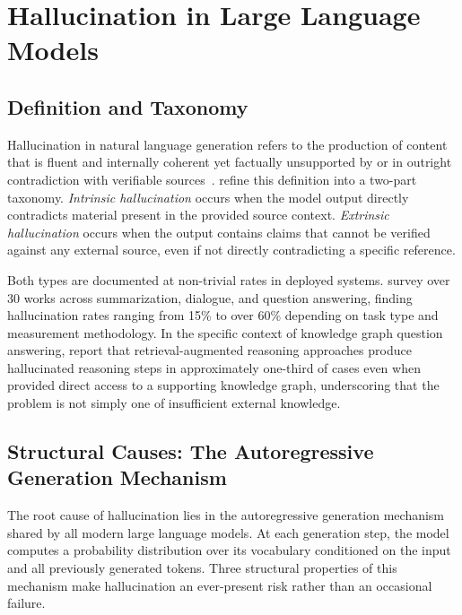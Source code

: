 \section{Hallucination in Large Language Models}
\label{sec:hallucination}

\subsection{Definition and Taxonomy}

Hallucination in natural language generation refers to the production of content that is fluent and internally coherent yet factually unsupported by or in outright contradiction with verifiable sources~\citep{ji2023survey}. \citet{huang2023hallucination} refine this definition into a two-part taxonomy. \textit{Intrinsic hallucination} occurs when the model output directly contradicts material present in the provided source context. \textit{Extrinsic hallucination} occurs when the output contains claims that cannot be verified against any external source, even if not directly contradicting a specific reference.

Both types are documented at non-trivial rates in deployed systems. \citet{ji2023survey} survey over 30 works across summarization, dialogue, and question answering, finding hallucination rates ranging from 15\% to over 60\% depending on task type and measurement methodology. In the specific context of knowledge graph question answering, \citet{luo2024gcr} report that retrieval-augmented reasoning approaches produce hallucinated reasoning steps in approximately one-third of cases even when provided direct access to a supporting knowledge graph, underscoring that the problem is not simply one of insufficient external knowledge.

\subsection{Structural Causes: The Autoregressive Generation Mechanism}

The root cause of hallucination lies in the autoregressive generation mechanism shared by all modern large language models. At each generation step, the model computes a probability distribution over its vocabulary conditioned on the input and all previously generated tokens. Three structural properties of this mechanism make hallucination an ever-present risk rather than an occasional failure.

